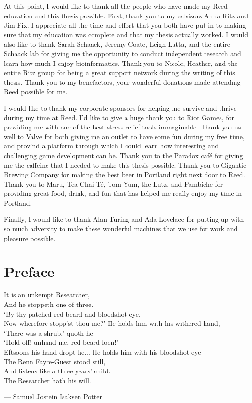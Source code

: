 \documentclass[12pt,twoside]{reedthesis}
\theoremstyle{definition}
\begin{document}
  At this point, I would like to thank all the people who have made my Reed education and this thesis possible. First, thank you to my advisors Anna Ritz and Jim Fix. I appreciate all the time and effort that you both have put in to making sure that my education was complete and that my thesis actually worked. I would also like to thank Sarah Schaack, Jeremy Coate, Leigh Latta, and the entire Schaack lab for giving me the opportunity to conduct independent research and learn how much I enjoy bioinformatics. Thank you to Nicole, Heather, and the entire Ritz group for being a great support network during the writing of this thesis. Thank you to my benefactors, your wonderful donations made attending Reed possible for me.\par
  I would like to thank my corporate sponsors for helping me survive and thrive during my time at Reed. I'd like to give a huge thank you to Riot Games, for providing me with one of the best stress relief tools immaginable. Thank you as well to Valve for both giving me an outlet to have some fun during my free time, and provind a platform through which I could learn how interesting and challenging game development can be. Thank you to the Paradox caf\'{e} for giving me the caffeine that I needed to make this thesis possible. Thank you to Gigantic Brewing Company for making the best beer in Portland right next door to Reed. Thank you to Maru, Tea Chai T\'{e}, Tom Yum, the Lutz, and Pambiche for providing great food, drink, and fun that has helped me really enjoy my time in Portland.\par
  Finally, I would like to thank Alan Turing and Ada Lovelace for putting up with so much adversity to make these wonderful machines that we use for work and pleasure possible.\par

    \chapter*{Preface}
  \begin{center}
\epigraph{
   It is an unkempt Researcher, \\
  And he stoppeth one of three. \\
  `By thy patched red beard and bloodshot eye, \\
  Now wherefore stopp'st thou me?'
  \bigbreak
  He holds him with his withered hand, \\
  `There was a shrub,' quoth he. \\
  `Hold off! unhand me, red-beard loon!' \\
  Eftsoons his hand dropt he...
  \bigbreak
  He holds him with his bloodshot eye--\\
  The Renn Fayre-Guest stood still, \\
  And listens like a three years' child: \\
  The Researcher hath his will.}{--- \textup{Samuel Jostein Isaksen Potter}}%
\end{center}
\end{document}
